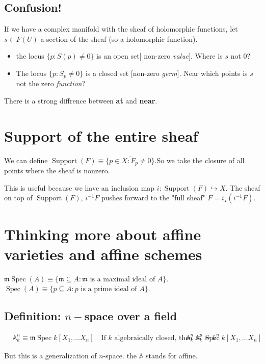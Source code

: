 \documentclass{book}
\newcommand{\A}{\ensuremath{\mathbb{A}}}
\newcommand{\spec}{\operatorname{Spec}}
\newcommand{\m}{\mathfrak{m}}
\newcommand{\mspec}{\m\operatorname{Spec}}
\newcommand{\supp}{\operatorname{Support}}
\theoremstyle{definition}
\begin{document}
\subsection{Confusion!}

If we have a complex manifold with the sheaf of holomorphic functions,
let $s \in F(U)$ a section of the sheaf (so a holomorphic function).
\begin{itemize}
    \item the locus $\{ p : S(p) \neq 0 \}$ is an open set[ non-zero \emph{value}].
        Where is $s$ not $0$?

    \item The locus $\{ p : S_p \neq 0 \}$ is a closed set [non-zero \emph{germ}]. 
        Near which points is $s$ not the zero \emph{function}?
\end{itemize}
There is a strong diffrence between \textbf{at} and \textbf{near}.

\section{Support of the entire sheaf}
We can define $\supp(F) \equiv \overline{\{ p \in X : F_p \neq 0 \}}$.So we
take the closure of all points where the sheaf is nonzero.

This is useful because we have an inclusion map $i: \supp(F) \hookrightarrow X$.
The sheaf on top of $\supp(F)$, $i^{-1} F$  pushes forward to the "full sheaf"
$F = i_\star (i^{-1} F)$.

\section{Thinking more about affine varieties and affine schemes}

$\mspec(A) \equiv \{ \m  \subseteq A : \m \text{ is a maximal ideal of } A \}$.
$\spec(A) \equiv \{ p \subseteq A : p \text{ is a prime ideal of } A \}$.

\subsection{Definition: $n-$space over a field}
\begin{align*}
    &\A^n_k \equiv \mspec k[X_1, \dots X_n] \quad \text{If $k$ algebraically closed, then $\A^n_k = k^n$}
    &\A^n_k \equiv \spec k[X_1, \dots X_n]
\end{align*}

But this is a generalization of $n$-space. the $\A$ stands for affine.
\end{document}
